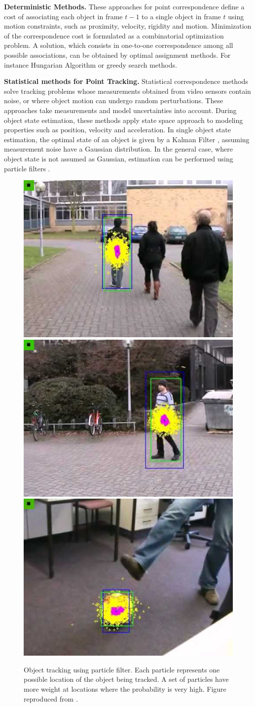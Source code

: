 \textbf{Deterministic Methods. } These approaches for point correspondence
define a cost of associating each object in frame $t-1$ to a single object in
frame $t$ using motion constraints, such as proximity, velocity, rigidity and
motion. Minimization of the correspondence cost is formulated as a
combinatorial optimization problem. A solution, which consists in one-to-one
correspondence among all possible associations, can be obtained by optimal
assignment methods. For instance Hungarian Algorithm \cite{Qin2012} or
greedy search methods.

\textbf{Statistical methods for Point Tracking. } Statistical correspondence
methods solve tracking problems whose measurements obtained from video sensors
contain noise, or where object motion can undergo random perturbations. These
approaches take measurements and model uncertainties into account. During
object state estimation, these methods apply state space approach to modeling
properties such as position, velocity and acceleration. In single object
state estimation, the optimal state of an object is given by a Kalman Filter
\cite{Ren2008a,Heikkila2004}, assuming measurement noise have a Gaussian
distribution. In the general case, where object state is not assumed as
Gaussian, estimation can be performed using particle filters
\cite{Okuma2004,Rittscher2000}.

\begin{figure}[t!!]
\centering
{
\includegraphics[width=0.32\linewidth]{Figures/particle_filter1.jpg}
\includegraphics[width=0.32\linewidth]{Figures/particle_filter2.jpg}
\includegraphics[width=0.32\linewidth]{Figures/particle_filter3.jpg}
}
\caption[Object tracking using particle filter]
		{Object tracking using particle filter. Each particle represents one
		possible location of the object being tracked. A set of particles have
		more weight at locations where the probability is very high. Figure
		reproduced from \cite{Rittscher2000}.}
\end{figure}


